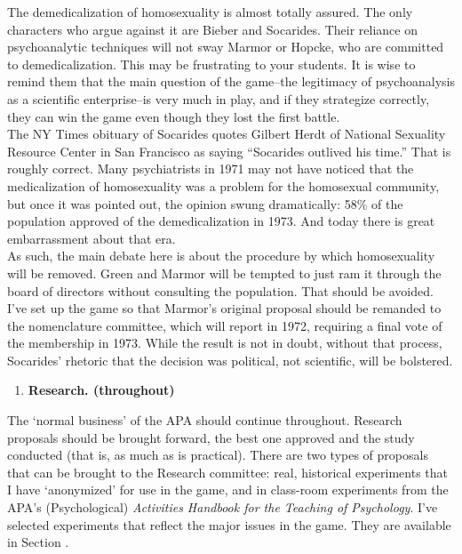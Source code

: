 \begin{refsection}
The demedicalization of homosexuality is almost totally assured. The only characters who argue against it are Bieber and Socarides. Their reliance on psychoanalytic techniques will not sway Marmor or Hopcke, who are committed to demedicalization. This may be frustrating to your students. It is wise to remind them that the main question of the game--the legitimacy of psychoanalysis as a scientific enterprise--is very much in play, and if they strategize correctly, they can win the game even though they lost the first battle.\\
The NY Times obituary of Socarides quotes Gilbert Herdt of National Sexuality Resource Center in San Francisco as saying “Socarides outlived his time.” That is roughly correct. Many psychiatrists in 1971 may not have noticed that the medicalization of homosexuality was a problem for the homosexual community, but once it was pointed out, the opinion swung dramatically: 58\% of the population approved of the demedicalization in 1973. And today there is great embarrassment about that era.\\
As such, the main debate here is about the procedure by which homosexuality will be removed. Green and Marmor will be tempted to just ram it through the board of directors without consulting the population. That should be avoided. I've set up the game so that Marmor's original proposal should be remanded to the nomenclature committee, which will report in 1972, requiring a final vote of the membership in 1973. While the result is not in doubt, without that process, Socarides' rhetoric that the decision was political, not scientific, will be bolstered.

\begin{enumerate}
\item \textbf{Research. (throughout)}

\end{enumerate}

The ‘normal business’ of the APA should continue throughout. Research proposals should be brought forward, the best one approved and the study conducted (that is, as much as is practical). There are two types of proposals that can be brought to the Research committee: real, historical experiments that I have `anonymized' for use in the game, and in class-room experiments from the APA’s (Psychological) \emph{Activities Handbook for the Teaching of Psychology}. I’ve selected experiments that reflect the major issues in the game. They are available in Section .


\end{refsection}
